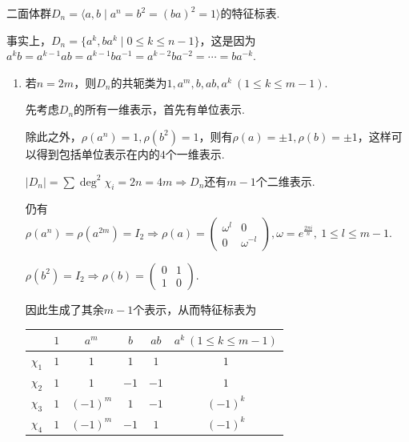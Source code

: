 \begin{instance}
    二面体群$D_n = \langle a, b \mid a^n = b^2 = (ba)^2 = 1 \rangle$的特征标表.\par
    事实上，$D_n = \{a^k, ba^k \mid 0 \leqslant k \leqslant n-1\}$，这是因为$a^k b = a^{k-1} a b = a^{k-1} b a^{-1} = a^{k-2} b a^{-2} = \cdots = b a^{-k}$.\par
    \begin{enumerate}
        \item[①] 若$n=2m$，则$D_n$的共轭类为$1, a^m, b, ab, a^k\ (1 \leqslant k \leqslant m-1)$.\par
        先考虑$D_n$的所有一维表示，首先有单位表示.\par
        除此之外，$\rho(a^n) = 1, \rho(b^2) = 1$，则有$\rho(a) = \pm 1, \rho(b) = \pm 1$，这样可以得到包括单位表示在内的$4$个一维表示.\par
        $|D_n| = \sum \deg^2 \chi_i = 2n = 4m \Rightarrow D_n$还有$m-1$个二维表示.\par
        仍有$\rho(a^n) = \rho(a^{2m}) = I_2 \Rightarrow \rho(a) = \begin{pmatrix} \omega^l & 0 \\ 0 & \omega^{-l} \end{pmatrix}, \omega = e^{\frac{2\pi i}{n}},\ 1 \leqslant l \leqslant m-1$.\par
        $\rho(b^2) = I_2 \Rightarrow \rho(b) = \begin{pmatrix} 0 & 1 \\ 1 & 0 \end{pmatrix}$.\par
        因此生成了其余$m-1$个表示，从而特征标表为
        \begin{center}
            \begin{tabular}{c|ccccc}
                                                     & $1$ & $a^m$      & $b$  & $ab$ & $a^k\ (1 \leqslant k \leqslant m-1)$ \\ \hline
                $\chi_1$                             & $1$ & $1$        & $1$  & $1$  & $1$                                \\
                $\chi_2$                             & $1$ & $1$        & $-1$ & $-1$ & $1$                                \\
                $\chi_3$                             & $1$ & $(-1)^m$   & $1$  & $-1$ & $(-1)^k$                           \\
                $\chi_4$                             & $1$ & $(-1)^m$   & $-1$ & $1$  & $(-1)^k$                           \\

\end{tabular}
\end{center}
\end{enumerate}
\end{instance}
